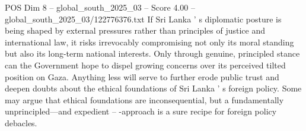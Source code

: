 \begin{textsample}{POS Dim 8 – global\_south\_2025\_03 – Score 4.00 – global\_south\_2025\_03/122776376.txt}
If Sri Lanka ' s diplomatic posture is being shaped by external pressures rather than principles of justice and international law, it risks irrevocably compromising not only its moral standing but also its long-term national interests.
Only through genuine, principled stance can the Government hope to dispel growing concerns over its perceived tilted position on Gaza.
Anything less will serve to further erode public trust and deepen doubts about the ethical foundations of Sri Lanka ' s foreign policy.
Some may argue that ethical foundations are inconsequential, but a fundamentally unprincipled---and expedient -- -approach is a sure recipe for foreign policy debacles.

\end{textsample}

